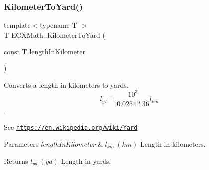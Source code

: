 \subsubsection{\texorpdfstring{Kilometer\+To\+Yard()}{KilometerToYard()}}
{\footnotesize\ttfamily template$<$typename T $>$ \\
T E\+G\+X\+Math\+::\+Kilometer\+To\+Yard (\begin{DoxyParamCaption}\item[{const T}]{length\+In\+Kilometer }\end{DoxyParamCaption})}



Converts a length in kilometers to yards. \[ l_{yd}= \frac{10^{3}}{0.0254 * 36} l_{km} \]. 

See \href{https://en.wikipedia.org/wiki/Yard}{\tt https\+://en.\+wikipedia.\+org/wiki/\+Yard} 
\begin{DoxyParams}{Parameters}
{\em length\+In\+Kilometer} & $ l_{km}\ (km)$ Length in kilometers. \\
\hline
\end{DoxyParams}
\begin{DoxyReturn}{Returns}
$ l_{yd}\ (yd)$ Length in yards. 
\end{DoxyReturn}
